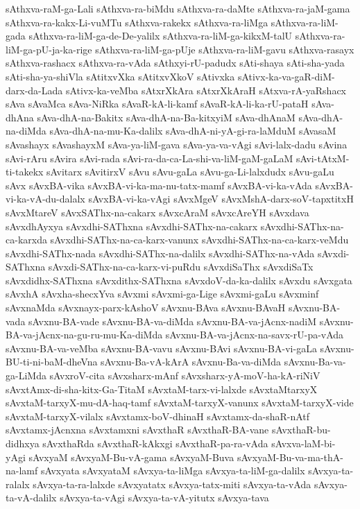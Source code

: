 {sAthxva-raM-ga-Lali
sAthxva-ra-biMdu
sAthxva-ra-daMte
sAthxva-ra-jaM-gama
sAthxva-ra-kakx-Li-vuMTu
sAthxva-rakekx
sAthxva-ra-liMga
sAthxva-ra-liM-gada
sAthxva-ra-liM-ga-de-De-yalilx
sAthxva-ra-liM-ga-kikxM-talU
sAthxva-ra-liM-ga-pU-ja-ka-rige
sAthxva-ra-liM-ga-pUje
sAthxva-ra-liM-gavu
sAthxva-rasayx
sAthxva-rashacx
sAthxva-ra-vAda
sAthxyi-rU-padudx
sAti-shaya
sAti-sha-yada
sAti-sha-ya-shiVla
sAtitxvXka
sAtitxvXkoV
sAtivxka
sAtivx-ka-va-gaR-diM-darx-da-Lada
sAtivx-ka-veMba
sAtxrXkAra
sAtxrXkAraH
sAtxva-rA-yaRshacx
sAva
sAvaMca
sAva-NiRka
sAvaR-kA-li-kamf
sAvaR-kA-li-ka-rU-pataH
sAva-dhAna
sAva-dhA-na-Bakitx
sAva-dhA-na-Ba-kitxyiM
sAva-dhAnaM
sAva-dhA-na-diMda
sAva-dhA-na-mu-Ka-dalilx
sAva-dhA-ni-yA-gi-ra-laMduM
sAvasaM
sAvashayx
sAvashayxM
sAva-ya-liM-gava
sAva-ya-va-vAgi
sAvi-lalx-dadu
sAvina
sAvi-rAru
sAvira
sAvi-rada
sAvi-ra-da-ca-La-shi-va-liM-gaM-gaLaM
sAvi-tAtxM-ti-takekx
sAvitarx
sAvitirxV
sAvu
sAvu-gaLa
sAvu-ga-Li-lalxdudx
sAvu-gaLu
sAvx
sAvxBA-vika
sAvxBA-vi-ka-ma-nu-tatx-mamf
sAvxBA-vi-ka-vAda
sAvxBA-vi-ka-vA-du-dalalx
sAvxBA-vi-ka-vAgi
sAvxMgeV
sAvxMshA-darx-soV-tapxtitxH
sAvxMtareV
sAvxSAThx-na-cakarx
sAvxcAraM
sAvxcAreYH
sAvxdava
sAvxdhAyxya
sAvxdhi-SAThxna
sAvxdhi-SAThx-na-cakarx
sAvxdhi-SAThx-na-ca-karxda
sAvxdhi-SAThx-na-ca-karx-vanunx
sAvxdhi-SAThx-na-ca-karx-veMdu
sAvxdhi-SAThx-nada
sAvxdhi-SAThx-na-dalilx
sAvxdhi-SAThx-na-vAda
sAvxdi-SAThxna
sAvxdi-SAThx-na-ca-karx-vi-puRdu
sAvxdiSaThx
sAvxdiSaTx
sAvxdidhx-SAThxna
sAvxdithx-SAThxna
sAvxdoV-da-ka-dalilx
sAvxdu
sAvxgata
sAvxhA
sAvxha-shecxYva
sAvxmi
sAvxmi-ga-Lige
sAvxmi-gaLu
sAvxminf
sAvxnaMda
sAvxnayx-parx-kAshoV
sAvxnu-BAva
sAvxnu-BAvaH
sAvxnu-BA-vada
sAvxnu-BA-vade
sAvxnu-BA-va-diMda
sAvxnu-BA-va-jAcnx-nadiM
sAvxnu-BA-va-jAcnx-na-gu-ru-mu-Ka-diMda
sAvxnu-BA-va-jAcnx-na-savx-rU-pa-vAda
sAvxnu-BA-va-veMba
sAvxnu-BA-vavu
sAvxnu-BAvi
sAvxnu-BA-vi-gaLa
sAvxnu-BU-ti-ni-baM-dheVna
sAvxnu-Ba-vA-kArA
sAvxnu-Ba-va-diMda
sAvxnu-Ba-va-ga-LiMda
sAvxroV-cita
sAvxsharx-mAnf
sAvxsharx-yA-moV-ha-kA-riNiV
sAvxtAmx-di-sha-kitx-Ga-TitaM
sAvxtaM-tarx-vi-lalxde
sAvxtaMtarxyX
sAvxtaM-tarxyX-mu-dA-haq-tamf
sAvxtaM-tarxyX-vanunx
sAvxtaM-tarxyX-vide
sAvxtaM-tarxyX-vilalx
sAvxtamx-boV-dhinaH
sAvxtamx-da-shaR-nAtf
sAvxtamx-jAcnxna
sAvxtamxni
sAvxthaR
sAvxthaR-BA-vane
sAvxthaR-bu-didhxya
sAvxthaRda
sAvxthaR-kAkxgi
sAvxthaR-pa-ra-vAda
sAvxva-laM-bi-yAgi
sAvxyaM
sAvxyaM-Bu-vA-gama
sAvxyaM-Buva
sAvxyaM-Bu-va-ma-thA-na-lamf
sAvxyata
sAvxyataM
sAvxya-ta-liMga
sAvxya-ta-liM-ga-dalilx
sAvxya-ta-ralalx
sAvxya-ta-ra-lalxde
sAvxyatatx
sAvxya-tatx-miti
sAvxya-ta-vAda
sAvxya-ta-vA-dalilx
sAvxya-ta-vAgi
sAvxya-ta-vA-yitutx
sAvxya-tava
}
